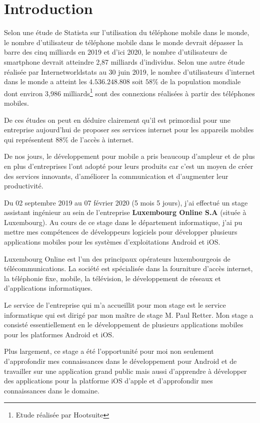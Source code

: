 \documentclass[report, backcover, french]{upmethodology-document}
\begin{document}
\chapter*{Introduction}
Selon une étude de Statista sur l'utilisation du téléphone mobile dans le monde, le nombre d'utilisateur de téléphone mobile dans le monde devrait dépasser la barre des cinq milliards en 2019 et d'ici 2020, le nombre d'utilisateurs de smartphone devrait atteindre 2,87 milliards d'individus. Selon une autre étude réalisée par \og Internetworldstats \fg{,}  au 30 juin 2019, le nombre d'utilisateurs d'internet dans le monde a atteint les $4.536.248.808$ soit $58 \% $ de la population mondiale dont environ 3,986 milliards\footnote{Etude réalisée par Hootsuite} sont des connexions réalisées à partir des téléphones mobiles.

De ces études on peut en déduire clairement qu'il est primordial pour une entreprise aujourd'hui de proposer ses services internet pour les appareils mobiles  qui  représentent $88\% $ de l'accès à internet. 

De nos jours, le développement pour mobile a pris beaucoup d'ampleur  et de plus en plus d'entreprises l'ont adopté pour leurs produits car c'est un moyen de créer des services innovants, d'améliorer la communication et d'augmenter leur productivité.

Du 02 septembre 2019 au 07 février 2020 (5 mois 5 jours), j'ai effectué un stage assistant ingénieur au sein de l'entreprise \textbf{Luxembourg Online S.A} (située à Luxembourg). Au cours de ce stage dans le département informatique, j'ai pu mettre mes compétences de développeurs logiciels pour développer plusieurs applications mobiles pour les systèmes d'exploitations Android et iOS.

Luxembourg Online est l'un des principaux opérateurs luxembourgeois de télécommunications. La société est spécialisée dans la fourniture d'accès internet, la téléphonie fixe, mobile, la télévision, le développement de réseaux et d'applications informatiques.

Le service de l'entreprise qui m'a accueillit pour mon stage est le service informatique qui est dirigé par mon maître de stage M. Paul Retter. Mon stage a consisté essentiellement en le développement de plusieurs applications mobiles pour les platformes Android et iOS.

Plus largement, ce stage a été l'opportunité pour moi non seulement d'approfondir mes connaissances dans le développement pour Android et de travailler sur une application grand public mais aussi d'apprendre à développer des applications pour la platforme iOS d'apple et d'approfondir mes connaissances dans le domaine.
\end{document}
